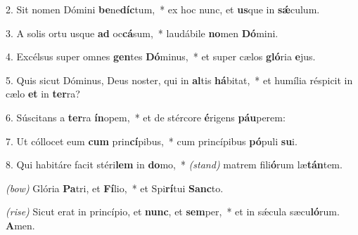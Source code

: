  2.  Sit nomen Dómini \textbf{be}ne\-\textbf{díc}tum,~*
	ex hoc nunc, et \textbf{us}que in \textbf{s\'{\ae}}culum.

 3. A solis ortu usque \textbf{ad} oc\textbf{cá}sum,~*
	laudábile \textbf{no}men \textbf{Dó}mini.

 4. Excélsus super omnes \textbf{gen}tes \textbf{Dó}\-minus,~*
	et super cælos \textbf{gló}ria \textbf{e}jus.

 5. Quis sicut Dóminus, Deus noster, qui in \textbf{al}tis \textbf{há}bitat,~*
	et humília réspicit in cælo \textbf{et} in \textbf{ter}ra?

 6. Súscitans a \textbf{ter}ra \textbf{ín}opem,~*
	et de stércore \textbf{é}rigens \textbf{páu}perem:

 7. Ut cóllocet eum \textbf{cum} prin\textbf{cí}pi\-bus,~*
	cum princípibus \textbf{pó}puli \textbf{su}i.

 8. Qui habitáre facit stéri\textbf{lem} in \textbf{do}\-mo,~* {\color{red}\textit{(stand)}}
	matrem fili\textbf{ó}rum læ\textbf{tán}tem.
	
{\color{red}\textit{(bow)}} Glória \textbf{Pa}tri, et \textbf{Fí}lio,~*
	et Spi\textbf{rí}tui \textbf{Sanc}to.

{\color{red}\textit{(rise)}} Sicut erat in princípio, et \textbf{nunc}, et \textbf{sem}per,~*
	et in s\'{\ae}cula sæcu\textbf{ló}rum. \textbf{A}men.
